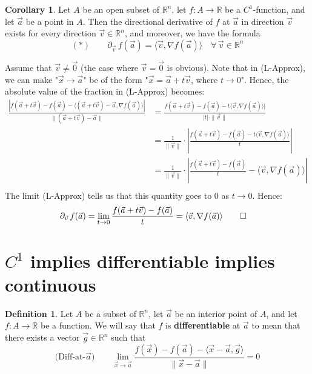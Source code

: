 \documentclass[11pt]{article}
\makeatletter
\theoremstyle{definition}
\newtheorem{defn}[thm]{Definition}
\newtheorem{cor}[thm]{Corollary}
\newcommand{\R}{\ensuremath{\mathbb{R}}}
\newenvironment{pf}[1][\proofname]{\par
  \pushQED{\qed}%
  \normalfont \topsep0\p@\relax
  \trivlist
  \item[\hskip\labelsep\itshape
  #1\@addpunct{.}]\ignorespaces
}{%
  \popQED\endtrivlist\@endpefalse
}
\makeatother
\begin{document}
\begin{cor}
Let $A$ be an open subset of $\R^n$, let $f : A \to \R$ be a $C^1$-function, and let $\vec{a}$ be a point in $A$. Then the directional derivative of $f$ at $\vec{a}$ in direction $\vec{v}$ exists for every direction $\vec{v} \in \R^n$, and moreover, we have the formula
$$(*) \qquad \partial_{\vec{v}}\,f(\vec{a}) = \langle \vec{v}, \nabla f(\vec{a}) \rangle \quad \forall \, \vec{v} \in \R^n$$
\begin{pf}
Assume that $\vec{v} \neq \vec{0}$ (the case where $\vec{v} = \vec{0}$ is obvious). Note that in (L-Approx), we can make "$\vec{x} \to \vec{a}$" be of the form "$\vec{x} = \vec{a} + t\vec{v}$, where $t \to 0$". Hence, the absolute value of the fraction in (L-Approx) becomes:
\begin{align*}
    \frac{|f(\vec{a} + t\vec{v}) - f(\vec{a}) - \langle (\vec{a} + t\vec{v}) - \vec{a}, \nabla f(\vec{a}) \rangle|}{\|(\vec{a} + t\vec{v}) - \vec{a}\|} 
    &= \frac{f(\vec{a} + t\vec{v}) - f(\vec{a}) - t\langle \vec{v}, \nabla f(\vec{a}) \rangle|}{|t|\cdot\|\vec{v}\|} \\
    &= \frac{1}{\|\vec{v}\|} \cdot \left| \frac{f(\vec{a} + t\vec{v}) - f(\vec{a}) - t\langle \vec{v}, \nabla f(\vec{a}) \rangle}t \right| \\
    &= \frac{1}{\|\vec{v}\|} \cdot \left| \frac{f(\vec{a} + t\vec{v}) - f(\vec{a})}t - \langle \vec{v}, \nabla f(\vec{a}) \rangle \right| \\
\end{align*}
The limit (L-Approx) tells us that this quantity goes to 0 as $t \to 0$. Hence:
\begin{align*} \partial_{\vec{v}}\,f(\vec{a}) &= \lim_{t\to0} \frac{f(\vec{a} + t\vec{v}) - f(\vec{a})}t = \langle \vec{v}, \nabla f(\vec{a}) \rangle \qedhere \end{align*}
\end{pf}
\end{cor}

\newpage
{}
\section{$C^1$ implies differentiable implies continuous}

\begin{defn}
Let $A$ be a subset of $\R^n$, let $\vec{a}$ be an interior point of $A$, and let $f : A \to \R$ be a function. We will say that $f$ is {\bf differentiable} at $\vec{a}$ to mean that there exists a vector $\vec{g} \in \R^n$ such that
$$\text{(Diff-at-$\vec{a}$)} \qquad \lim_{\vec{x}\to\vec{a}} \frac{f(\vec{x}) - f(\vec{a}) - \langle \vec{x} - \vec{a}, \vec{g} \rangle}{\|\vec{x} - \vec{a}\|} = 0$$
\end{defn}
\end{document}
